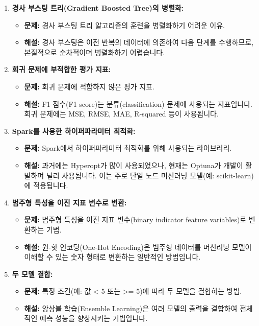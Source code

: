 \documentclass[11pt,a4paper]{article}
\begin{document}
\begin{enumerate}
    \item \textbf{경사 부스팅 트리(Gradient Boosted Tree)의 병렬화:}
    \begin{itemize}
        \item \textbf{문제:} 경사 부스팅 트리 알고리즘의 훈련을 병렬화하기 어려운 이유.
        \item \textbf{해설:} 경사 부스팅은 이전 반복의 데이터에 의존하여 다음 단계를 수행하므로, 본질적으로 순차적이며 병렬화하기 어렵습니다.
    \end{itemize}

    \item \textbf{회귀 문제에 부적합한 평가 지표:}
    \begin{itemize}
        \item \textbf{문제:} 회귀 문제에 적합하지 않은 평가 지표.
        \item \textbf{해설:} F1 점수(F1 score)는 분류(classification) 문제에 사용되는 지표입니다. 회귀 문제에는 MSE, RMSE, MAE, R-squared 등이 사용됩니다.
    \end{itemize}

    \item \textbf{Spark를 사용한 하이퍼파라미터 최적화:}
    \begin{itemize}
        \item \textbf{문제:} Spark에서 하이퍼파라미터 최적화를 위해 사용되는 라이브러리.
        \item \textbf{해설:} 과거에는 Hyperopt가 많이 사용되었으나, 현재는 Optuna가 개발이 활발하며 널리 사용됩니다. 이는 주로 단일 노드 머신러닝 모델(예: scikit-learn)에 적용됩니다.
    \end{itemize}

    \item \textbf{범주형 특성을 이진 지표 변수로 변환:}
    \begin{itemize}
        \item \textbf{문제:} 범주형 특성을 이진 지표 변수(binary indicator feature variables)로 변환하는 기법.
        \item \textbf{해설:} 원-핫 인코딩(One-Hot Encoding)은 범주형 데이터를 머신러닝 모델이 이해할 수 있는 숫자 형태로 변환하는 일반적인 방법입니다.
    \end{itemize}

    \item \textbf{두 모델 결합:}
    \begin{itemize}
        \item \textbf{문제:} 특정 조건(예: 값 < 5 또는 >= 5)에 따라 두 모델을 결합하는 방법.
        \item \textbf{해설:} 앙상블 학습(Ensemble Learning)은 여러 모델의 출력을 결합하여 전체적인 예측 성능을 향상시키는 기법입니다.
    \end{itemize}


\end{enumerate}
\end{document}
